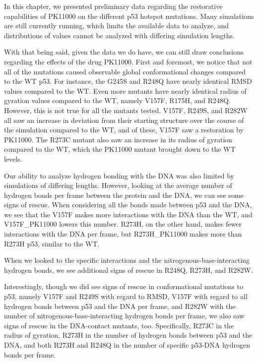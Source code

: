 In this chapter, we presented preliminary data regarding the restorative capabilities of PK11000 on the different p53 hotspot mutations. Many simulations are still currently running, which limits the available data to analyze, and distributions of values cannot be analyzed with differing simulation lengths.

With that being said, given the data we do have, we can still draw conclusions regarding the effects of the drug PK11000. First and foremost, we notice that not all of the mutations caused observable global conformational changes compared to the WT p53. For instance, the G245S and R248Q have nearly identical RMSD values compared to the WT. Even more mutants have nearly identical radius of gyration values compared to the WT, namely V157F, R175H, and R248Q. However, this is not true for all the mutants tested. V157F, R249S, and R282W all saw an increase in deviation from their starting structure over the course of the simulation compared to the WT, and of these, V157F saw a restoration by PK11000. The R273C mutant also saw an increase in its radius of gyration compared to the WT, which the PK11000 mutant brought down to the WT levels.

Our ability to analyze hydrogen bonding with the DNA was also limited by simulations of differing lengths. However, looking at the average number of hydrogen bonds per frame between the protein and the DNA, we can see some signs of rescue. When considering all the bonds made between p53 and the DNA, we see that the V157F makes more interactions with the DNA than the WT, and V157F\_PK11000 lowers this number. R273H, on the other hand, makes fewer interactions with the DNA per frame, but R273H\_PK11000 makes more than R273H p53, similar to the WT.

When we looked to the specific interactions and the nitrogenous-base-interacting hydrogen bonds, we see additional signs of rescue in R248Q, R273H, and R282W.

Interestingly, though we did see signs of rescue in conformational mutations to p53, namely V157F and R249S with regard to RMSD, V157F with regard to all hydrogen bonds between p53 and the DNA per frame, and R282W with the number of nitrogenous-base-interacting hydrogen bonds per frame, we also saw signs of rescue in the DNA-contact mutants, too. Specifically, R273C in the radius of gyration, R273H in the number of hydrogen bonds between p53 and the DNA, and both R273H and R248Q in the number of specific p53-DNA hydrogen bonds per frame.

